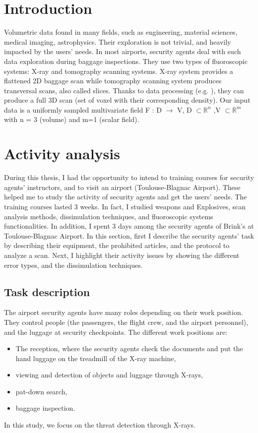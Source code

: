 \section{Introduction}
Volumetric data found in many fields, such as engineering, material sciences, medical imaging, astrophysics. Their exploration is not trivial, and heavily impacted by the users' needs. In most airports, security agents deal with such data exploration during baggage inspections. They use two types of fluoroscopic systems: X-ray and tomography scanning systems. X-ray system provides a flattened 2D baggage scan while tomography scanning system produces transversal scans, also called slices. 
Thanks to data processing (e.g. \cite{deans2007radon}), they can produce a full 3D scan (set of voxel with their corresponding density).
Our input data is a uniformly sampled multivariate field F : D $\longrightarrow$ V, D $\subset \mathbb{R}^{n}$ 
,V $\subset \mathbb{R}^{m}$ with n = 3 (volume) and m=1 (scalar field).



\section{Activity analysis}

During this thesis, I had the opportunity to intend to training courses for security agents' instructors, and to visit an airport (Toulouse-Blagnac Airport). These helped me to study the activity of security agents and get the users' needs. The training courses lasted 3 weeks. In fact, I studied weapons and Explosives, scan analysis methods, dissimulation techniques, and fluoroscopic systems functionalities. In addition, I spent 3 days among the security agents of Brink's at Toulouse-Blagnac Airport. In this section, first I describe the security agents' task by describing their equipment, the prohibited articles, and the protocol to analyze a scan. Next, I highlight their activity issues by showing the different error types, and the dissimulation techniques.

\subsection{Task description}

The airport security agents have many roles depending on their work position. They control people (the passengers, the flight crew, and the airport personnel), and the luggage at security checkpoints. The different work positions are:
\begin{itemize}
\item The reception, where the security agents check the documents and put the hand luggage on the treadmill of the X-ray machine,
\item viewing and detection of objects and luggage through X-rays,
\item pat-down search,
\item baggage inspection.
\end{itemize}
In this study, we focus on the threat detection through X-rays.

